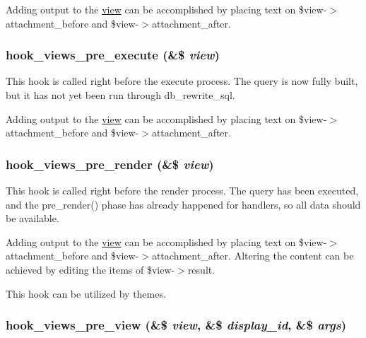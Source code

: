 Adding output to the \hyperlink{classview}{view} can be accomplished by placing text on \$view-$>$attachment\_\-before and \$view-$>$attachment\_\-after. \hypertarget{group__views__hooks_gf7582b210bdd367d6006c7dc62304475}{
\subsubsection[{hook\_\-views\_\-pre\_\-execute}]{\setlength{\rightskip}{0pt plus 5cm}hook\_\-views\_\-pre\_\-execute (\&\$ {\em view})}}
\label{group__views__hooks_gf7582b210bdd367d6006c7dc62304475}


This hook is called right before the execute process. The query is now fully built, but it has not yet been run through db\_\-rewrite\_\-sql.

Adding output to the \hyperlink{classview}{view} can be accomplished by placing text on \$view-$>$attachment\_\-before and \$view-$>$attachment\_\-after. \hypertarget{group__views__hooks_gb88d5c49ec4ad30dba2be34327d5b0cc}{
\subsubsection[{hook\_\-views\_\-pre\_\-render}]{\setlength{\rightskip}{0pt plus 5cm}hook\_\-views\_\-pre\_\-render (\&\$ {\em view})}}
\label{group__views__hooks_gb88d5c49ec4ad30dba2be34327d5b0cc}


This hook is called right before the render process. The query has been executed, and the pre\_\-render() phase has already happened for handlers, so all data should be available.

Adding output to the \hyperlink{classview}{view} can be accomplished by placing text on \$view-$>$attachment\_\-before and \$view-$>$attachment\_\-after. Altering the content can be achieved by editing the items of \$view-$>$result.

This hook can be utilized by themes. \hypertarget{group__views__hooks_g471b90caa886a4e4239a839d6bf7a963}{
\subsubsection[{hook\_\-views\_\-pre\_\-view}]{\setlength{\rightskip}{0pt plus 5cm}hook\_\-views\_\-pre\_\-view (\&\$ {\em view}, \/  \&\$ {\em display\_\-id}, \/  \&\$ {\em args})}}
\label{group__views__hooks_g471b90caa886a4e4239a839d6bf7a963}


